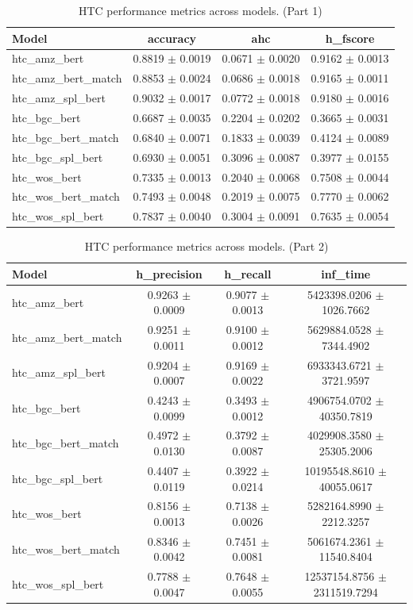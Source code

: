 \begin{table}[htbp]
\centering
\small
\begin{tabular}{lccc}
\toprule
Model & accuracy & ahc & h\_fscore \\
\midrule
htc\_amz\_bert & 0.8819 $\pm$ 0.0019 & 0.0671 $\pm$ 0.0020 & 0.9162 $\pm$ 0.0013 \\
htc\_amz\_bert\_match & 0.8853 $\pm$ 0.0024 & 0.0686 $\pm$ 0.0018 & 0.9165 $\pm$ 0.0011 \\
htc\_amz\_spl\_bert & 0.9032 $\pm$ 0.0017 & 0.0772 $\pm$ 0.0018 & 0.9180 $\pm$ 0.0016 \\
htc\_bgc\_bert & 0.6687 $\pm$ 0.0035 & 0.2204 $\pm$ 0.0202 & 0.3665 $\pm$ 0.0031 \\
htc\_bgc\_bert\_match & 0.6840 $\pm$ 0.0071 & 0.1833 $\pm$ 0.0039 & 0.4124 $\pm$ 0.0089 \\
htc\_bgc\_spl\_bert & 0.6930 $\pm$ 0.0051 & 0.3096 $\pm$ 0.0087 & 0.3977 $\pm$ 0.0155 \\
htc\_wos\_bert & 0.7335 $\pm$ 0.0013 & 0.2040 $\pm$ 0.0068 & 0.7508 $\pm$ 0.0044 \\
htc\_wos\_bert\_match & 0.7493 $\pm$ 0.0048 & 0.2019 $\pm$ 0.0075 & 0.7770 $\pm$ 0.0062 \\
htc\_wos\_spl\_bert & 0.7837 $\pm$ 0.0040 & 0.3004 $\pm$ 0.0091 & 0.7635 $\pm$ 0.0054 \\
\bottomrule
\end{tabular}
\caption{HTC performance metrics across models. (Part 1)}
\label{tab:htc_metrics_part1}
\end{table}

\begin{table}[htbp]
\centering
\small
\begin{tabular}{lccc}
\toprule
Model & h\_precision & h\_recall & inf\_time \\
\midrule
htc\_amz\_bert & 0.9263 $\pm$ 0.0009 & 0.9077 $\pm$ 0.0013 & 5423398.0206 $\pm$ 1026.7662 \\
htc\_amz\_bert\_match & 0.9251 $\pm$ 0.0011 & 0.9100 $\pm$ 0.0012 & 5629884.0528 $\pm$ 7344.4902 \\
htc\_amz\_spl\_bert & 0.9204 $\pm$ 0.0007 & 0.9169 $\pm$ 0.0022 & 6933343.6721 $\pm$ 3721.9597 \\
htc\_bgc\_bert & 0.4243 $\pm$ 0.0099 & 0.3493 $\pm$ 0.0012 & 4906754.0702 $\pm$ 40350.7819 \\
htc\_bgc\_bert\_match & 0.4972 $\pm$ 0.0130 & 0.3792 $\pm$ 0.0087 & 4029908.3580 $\pm$ 25305.2006 \\
htc\_bgc\_spl\_bert & 0.4407 $\pm$ 0.0119 & 0.3922 $\pm$ 0.0214 & 10195548.8610 $\pm$ 40055.0617 \\
htc\_wos\_bert & 0.8156 $\pm$ 0.0013 & 0.7138 $\pm$ 0.0026 & 5282164.8990 $\pm$ 2212.3257 \\
htc\_wos\_bert\_match & 0.8346 $\pm$ 0.0042 & 0.7451 $\pm$ 0.0081 & 5061674.2361 $\pm$ 11540.8404 \\
htc\_wos\_spl\_bert & 0.7788 $\pm$ 0.0047 & 0.7648 $\pm$ 0.0055 & 12537154.8756 $\pm$ 2311519.7294 \\
\bottomrule
\end{tabular}
\caption{HTC performance metrics across models. (Part 2)}
\label{tab:htc_metrics_part2}
\end{table}

